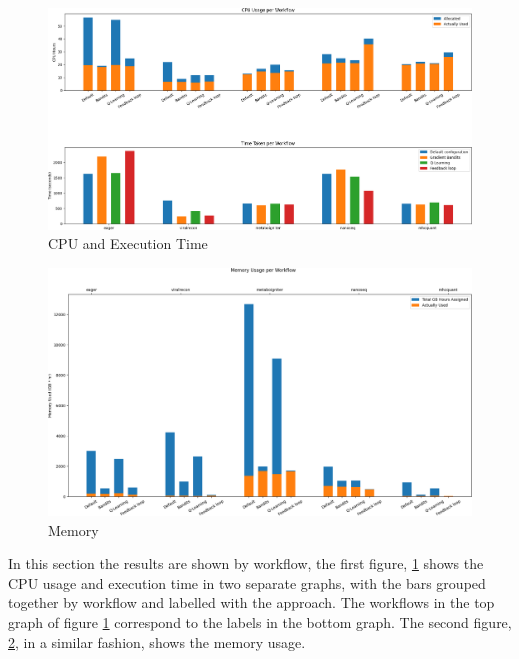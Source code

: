 \begin{figure}[h!]
    \centering
        \includegraphics[width=\textwidth]{fig/per_wf_stats.png}
        \caption{CPU and Execution Time}
        \label{fig:per_wf_cpu}
\end{figure}

\begin{figure}[h!]
    \centering
        \includegraphics[width=\textwidth]{fig/mem_use_per_wf.png}
        \caption{Memory}
        \label{fig:per_wf_mem}
\end{figure}

In this section the results are shown by workflow, the first figure, \ref{fig:per_wf_cpu} shows the CPU usage and execution time in two separate graphs, with the bars grouped together by workflow and labelled with the approach. The workflows in the top graph of figure \ref{fig:per_wf_cpu} correspond to the labels in the bottom graph. The second figure, \ref{fig:per_wf_mem}, in a similar fashion, shows the memory usage.

